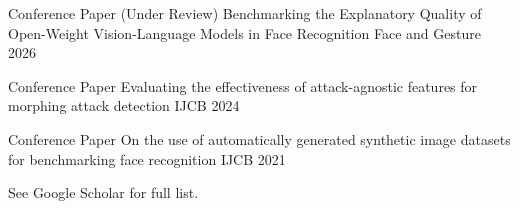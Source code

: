 

\begin{cvhonors}

  \cvhonor
    {Conference Paper (Under Review)} %
    {Benchmarking the Explanatory Quality of Open-Weight Vision-Language Models in Face Recognition} %
    {Face and Gesture} %
    {2026} %

  \cvhonor
    {Conference Paper} %
    {Evaluating the effectiveness of attack-agnostic features for morphing attack detection} %
    {IJCB} %
    {2024} %

  \cvhonor
    {Conference Paper} %
    {On the use of automatically generated synthetic image datasets for benchmarking face recognition} %
    {IJCB} %
    {2021} %

\end{cvhonors}
\tiny{See Google Scholar for full list.}
